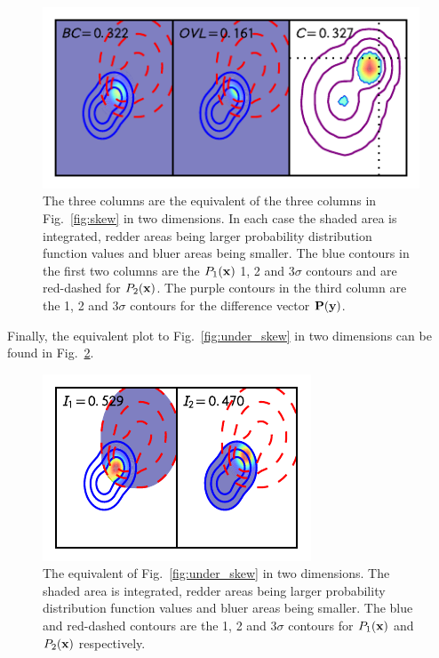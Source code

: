 \documentclass[twocolumn]{revtex4-1}
\begin{document}
    \begin{figure}
        \centering
        \includegraphics{../comparison/plots/skew_2D.pdf}
        \caption{The three columns are the equivalent of the three columns in Fig.~\ref{fig:skew} in two dimensions.
                 In each case the shaded area is integrated, redder areas being larger probability distribution function values and bluer areas being smaller.
                 The blue contours in the first two columns are the $P_1({\bf x})$ 1, 2 and 3$\sigma$ contours and are red-dashed for $P_2({\bf x})$.
                 The purple contours in the third column are the 1, 2 and 3$\sigma$ contours for the difference vector ${\bf P}({\bf y})$.}
        \label{fig:skew_2D}
    \end{figure}
    \noindent Finally, the equivalent plot to Fig.~\ref{fig:under_skew} in two dimensions can be found in Fig.~\ref{fig:under_skew_2D}.
    \begin{figure}
        \centering
        \includegraphics{../comparison/plots/under_skew_2D.pdf}
        \caption{The equivalent of Fig.~\ref{fig:under_skew} in two dimensions.
                 The shaded area is integrated, redder areas being larger probability distribution function values and bluer areas being smaller.
                 The blue and red-dashed contours are the 1, 2 and 3$\sigma$ contours for $P_1({\bf x})$ and $P_2({\bf x})$ respectively.}
        \label{fig:under_skew_2D}
    \end{figure}
\end{document}
